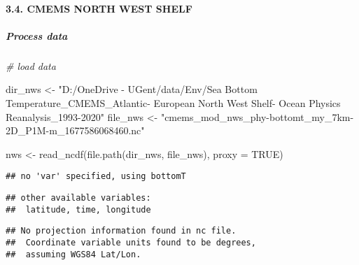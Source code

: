\documentclass[
]{article}
\newenvironment{Shaded}{\begin{snugshade}}{\end{snugshade}}
\newcommand{\AttributeTok}[1]{\textcolor[rgb]{0.77,0.63,0.00}{#1}}
\newcommand{\CommentTok}[1]{\textcolor[rgb]{0.56,0.35,0.01}{\textit{#1}}}
\newcommand{\ConstantTok}[1]{\textcolor[rgb]{0.00,0.00,0.00}{#1}}
\newcommand{\FunctionTok}[1]{\textcolor[rgb]{0.00,0.00,0.00}{#1}}
\newcommand{\NormalTok}[1]{#1}
\newcommand{\OtherTok}[1]{\textcolor[rgb]{0.56,0.35,0.01}{#1}}
\newcommand{\StringTok}[1]{\textcolor[rgb]{0.31,0.60,0.02}{#1}}
\begin{document}
\hypertarget{cmems-north-west-shelf}{%
\paragraph{3.4. CMEMS NORTH WEST SHELF}\label{cmems-north-west-shelf}}

\hypertarget{process-data-2}{%
\subparagraph{Process data}\label{process-data-2}}

\begin{Shaded}
\begin{Highlighting}[]
\CommentTok{\# load data}

\NormalTok{dir\_nws }\OtherTok{\textless{}{-}} \StringTok{"D:/OneDrive {-} UGent/data/Env/Sea Bottom Temperature\_CMEMS\_Atlantic{-} European North West Shelf{-} Ocean Physics Reanalysis\_1993{-}2020"}
\NormalTok{file\_nws }\OtherTok{\textless{}{-}} \StringTok{"cmems\_mod\_nws\_phy{-}bottomt\_my\_7km{-}2D\_P1M{-}m\_1677586068460.nc"}

\NormalTok{nws }\OtherTok{\textless{}{-}} \FunctionTok{read\_ncdf}\NormalTok{(}\FunctionTok{file.path}\NormalTok{(dir\_nws, file\_nws), }\AttributeTok{proxy =} \ConstantTok{TRUE}\NormalTok{) }
\end{Highlighting}
\end{Shaded}

\begin{verbatim}
## no 'var' specified, using bottomT
\end{verbatim}

\begin{verbatim}
## other available variables:
##  latitude, time, longitude
\end{verbatim}

\begin{verbatim}
## No projection information found in nc file. 
##  Coordinate variable units found to be degrees, 
##  assuming WGS84 Lat/Lon.
\end{verbatim}
\end{document}
